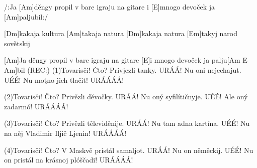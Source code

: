 
/:Ja [Am]děngy propil v bare
igraju na gitare
i [E]mnogo devoček ja [Am]paljubil:/

[Dm]kakaja kultura [Am]takaja natura 
[Dm]kakaja natura [Em]takyj narod sovětskij

[Am]Ja děngy propil v bare
igraju na gitare 
[E]i mnogo devoček ja palju[Am E Am]bil
(REC:)
(1)Tovarisči!                         Čto?
Privjezli tanky.                   URÁÁ!
Nu oni nejechajut.                 UÉÉ!
Nu moţno jich tlačit!              URÁÁÁÁ!

(2)Tovarisči!                         Čto?
Privězli děvočky.                  URÁÁ! 
Nu oný syfilítičnyje.              UÉÉ! 
Ale oný zadarmó!                   URÁÁÁÁ!

(3)Tovarisči!                         Čto?
Privězli těleviděnije.             URÁÁ!
Nu tam adna kartína.               UÉÉ!
Nu na něj Vladimir Iljič Ljenin!   URÁÁÁÁ!

(4)Tovarisči!                         Čto?
V Maskvě pristál samaljot.         URÁÁ!
Nu on něměckij.                    UÉÉ!
Nu on pristál na krásnoj plóščadi! URÁÁÁÁ!